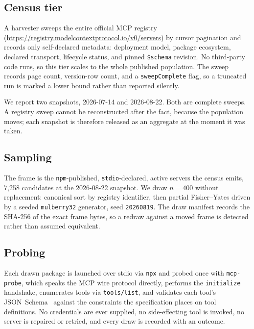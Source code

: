 \documentclass[11pt]{article}
\begin{document}
\subsection{Census tier}
A harvester sweeps the entire official MCP registry
(\url{https://registry.modelcontextprotocol.io/v0/servers}) by cursor pagination
and records only self-declared metadata: deployment model, package ecosystem,
declared transport, lifecycle status, and pinned \texttt{\$schema} revision. No
third-party code runs, so this tier scales to the whole published population. The
sweep records page count, version-row count, and a \texttt{sweepComplete} flag, so
a truncated run is marked a lower bound rather than reported silently.

We report two snapshots, 2026-07-14 and 2026-08-22. Both are complete sweeps. A
registry sweep cannot be reconstructed after the fact, because the population
moves; each snapshot is therefore released as an aggregate at the moment it was
taken.

\subsection{Sampling}
The frame is the \texttt{npm}-published, \texttt{stdio}-declared, active servers
the census emits, 7{,}258 candidates at the 2026-08-22 snapshot. We draw
$n=400$ without replacement: canonical sort by registry identifier, then partial
Fisher--Yates driven by a seeded \texttt{mulberry32} generator, seed
\texttt{20260819}. The draw manifest records the SHA-256 of the exact frame bytes,
so a redraw against a moved frame is detected rather than assumed equivalent.

\subsection{Probing}
Each drawn package is launched over stdio via \texttt{npx} and probed once with
\texttt{mcp-probe}, which speaks the MCP wire protocol directly, performs the
\texttt{initialize} handshake, enumerates tools via \texttt{tools/list}, and
validates each tool's JSON~Schema~\cite{jsonschema} against the constraints the
specification places on tool definitions. No credentials are ever supplied, no
side-effecting tool is invoked, no server is repaired or retried, and every draw
is recorded with an outcome.
\end{document}
